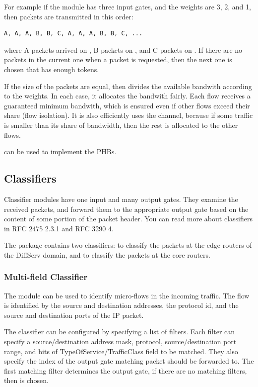 For example if the module has three input gates, and the weights
are 3, 2, and 1, then packets are transmitted in this order:

\begin{verbatim}
A, A, A, B, B, C, A, A, A, B, B, C, ...
\end{verbatim}

where A packets arrived on , B packets on ,
and C packets on . If there are no packets in the current
one when a packet is requested, then the next one is chosen that has
enough tokens.

If the size of the packets are equal, then 
divides the available bandwith according to the weights. In each
case, it allocates the bandwith fairly. Each flow receives a guaranteed
minimum bandwith, which is ensured even if other flows exceed
their share (flow isolation). It is also efficiently uses the
channel, because if some traffic is smaller than its share of
bandwidth, then the rest is allocated to the other flows.

 can be used to implement the  PHBs.

\subsection{Classifiers}

Classifier modules have one input and many output gates.
They examine the received packets, and forward them to the
appropriate output gate based on the content of some portion
of the packet header. You can read more about classifiers
in RFC 2475 2.3.1 and RFC 3290 4.

The  package contains two
classifiers:  to classify
the packets at the edge routers of the DiffServ domain, and
 to classify the packets
at the core routers.


\subsubsection*{Multi-field Classifier}

The  module can be used to identify
micro-flows in the incoming traffic. The flow is identified
by the source and destination addresses, the protocol id,
and the source and destination ports of the IP packet.

The classifier can be configured by specifying a list of filters.
Each filter can specify a source/destination address mask, protocol,
source/destination port range, and bits of TypeOfService/TrafficClass
field to be matched. They also specify the index of the output gate
matching packet should be forwarded to. The first matching filter
determines the output gate, if there are no matching filters,
then  is chosen.

